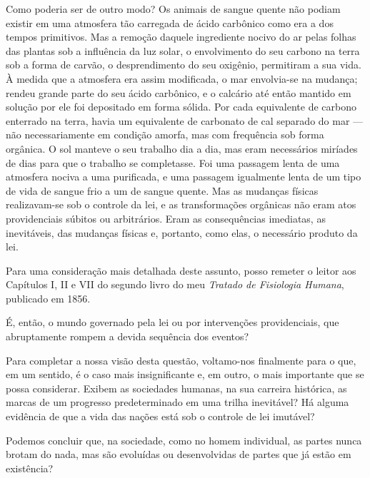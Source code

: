 \documentclass[11pt,a5paper,twoside,openany]{book}
\begin{document}
Como poderia ser de outro modo? Os animais de sangue quente não podiam existir em uma atmosfera tão carregada de ácido carbônico como era a dos tempos primitivos. Mas a remoção daquele ingrediente nocivo do ar pelas folhas das plantas sob a influência da luz solar, o envolvimento do seu carbono na terra sob a forma de carvão, o desprendimento do seu oxigênio, permitiram a sua vida. À medida que a atmosfera era assim modificada, o mar envolvia-se na mudança; rendeu grande parte do seu ácido carbônico, e o calcário até então mantido em solução por ele foi depositado em forma sólida. Por cada equivalente de carbono enterrado na terra, havia um equivalente de carbonato de cal separado do mar — não necessariamente em condição amorfa, mas com frequência sob forma orgânica. O sol manteve o seu trabalho dia a dia, mas eram necessários miríades de dias para que o trabalho se completasse. Foi uma passagem lenta de uma atmosfera nociva a uma purificada, e uma passagem igualmente lenta de um tipo de vida de sangue frio a um de sangue quente. Mas as mudanças físicas realizavam-se sob o controle da lei, e as transformações orgânicas não eram atos providenciais súbitos ou arbitrários. Eram as consequências imediatas, as inevitáveis, das mudanças físicas e, portanto, como elas, o necessário produto da lei.

Para uma consideração mais detalhada deste assunto, posso remeter o leitor aos Capítulos I, II e VII do segundo livro do meu \textit{Tratado de Fisiologia Humana}, publicado em 1856.

É, então, o mundo governado pela lei ou por intervenções providenciais, que abruptamente rompem a devida sequência dos eventos?

Para completar a nossa visão desta questão, voltamo-nos finalmente para o que, em um sentido, é o caso mais insignificante e, em outro, o mais importante que se possa considerar. Exibem as sociedades humanas, na sua carreira histórica, as marcas de um progresso predeterminado em uma trilha inevitável? Há alguma evidência de que a vida das nações está sob o controle de lei imutável?

Podemos concluir que, na sociedade, como no homem individual, as partes nunca brotam do nada, mas são evoluídas ou desenvolvidas de partes que já estão em existência?
\end{document}
